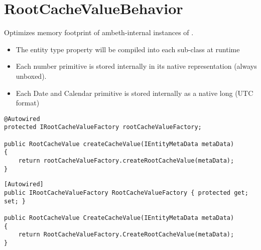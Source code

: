 \section{RootCacheValueBehavior}
\label{feature:RootCacheValueBehavior}
\ClearAPI
Optimizes memory footprint of ambeth-internal instances of .

\begin{itemize}
	\item The entity type property will be compiled into each sub-class at runtime
	\item Each number primitive is stored internally in its native representation (always unboxed).
	\item Each Date and Calendar primitive is stored internally as a native long (UTC format)
\end{itemize}

\begin{lstlisting}[style=Java,caption={Example usage to receive a memory optimized instance of \type{RootCacheValue} (Java)}]
@Autowired
protected IRootCacheValueFactory rootCacheValueFactory;

public RootCacheValue createCacheValue(IEntityMetaData metaData)
{
	return rootCacheValueFactory.createRootCacheValue(metaData);
}
\end{lstlisting}
\begin{lstlisting}[style=Csharp,caption={Example usage to receive a memory optimized instance of \type{RootCacheValue} (C\#)}]
[Autowired]
public IRootCacheValueFactory RootCacheValueFactory { protected get; set; }

public RootCacheValue CreateCacheValue(IEntityMetaData metaData)
{
	return RootCacheValueFactory.CreateRootCacheValue(metaData);
}
\end{lstlisting}
